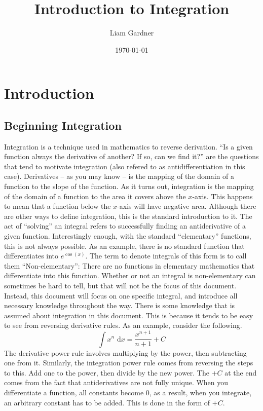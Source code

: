 \documentclass[oneside]{book}
\title{Introduction to Integration}
\author{Liam Gardner}
\date{\today}
\newcommand\tab[1][1cm]{\hspace*{#1}}
\newcommand\nextline{\newline\tab}
\renewcommand\d[1]{\text{ d}#1}
\newcommand{\abs}[1]{\left\lvert#1\right\rvert}
\begin{document}

\renewcommand\cellgape{\Gape[4pt]}

\maketitle
\tableofcontents
\chapter{Introduction}
\section{Beginning Integration}
\tab
Integration is a technique used in mathematics to reverse derivation. ``Is a given function always the derivative of another? If so, can we find it?'' are the questions that tend to motivate integration (also refered to as antidifferentiation in this case). Derivatives -- as you may know -- is the mapping of the domain of a function to the slope of the function. As it turns out, integration is the mapping of the domain of a function to the area it covers above the $x$-axis. This happens to mean that a function below the $x$-axis will have negative area. Although there are other ways to define integration, this is the standard introduction to it.
\nextline
The act of ``solving'' an integral refers to successfully finding an antiderivative of a given function. Interestingly enough, with the standard ``elementary'' functions, this is not always possible. As an example, there is no standard function that differentiates into $e^{\cos(x)}$. The term to denote integrals of this form is to call them ``Non-elementary'': There are no functions in elementary mathematics that differentiate into this function. Whether or not an integral is non-elementary can sometimes be hard to tell, but that will not be the focus of this document. Instead, this document will focus on one specific integral, and introduce all necessary knowledge throughout the way.
\nextline
There is some knowledge that is assumed about integration in this document. This is because it tends to be easy to see from reversing derivative rules. As an example, consider the following.
\begin{equation*}
\int x^n \d{x} = \frac{x^{n+1}}{n+1} + C
\end{equation*}
\tab
The derivative power rule involves multiplying by the power, then subtracting one from it. Similarly, the integration power rule comes from reversing the steps to this. Add one to the power, then divide by the new power. The $+C$ at the end comes from the fact that antiderivatives are not fully unique. When you differentiate a function, all constants become 0, as a result, when you integrate, an arbitrary constant has to be added. This is done in the form of $+C$.
\end{document}
